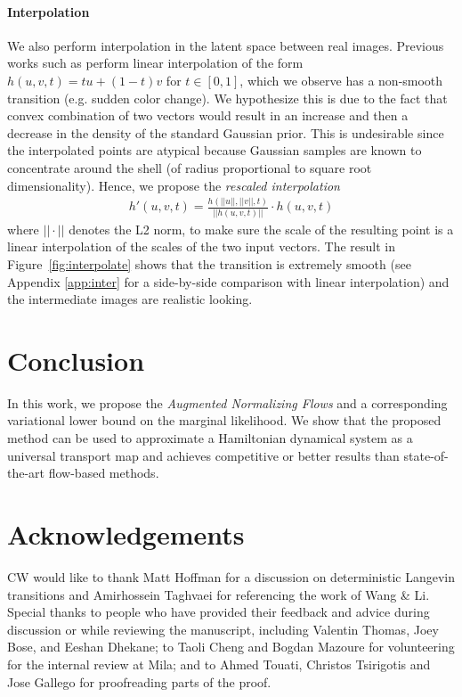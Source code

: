 \documentclass{article}
\begin{document}
\paragraph{Interpolation}
We also perform interpolation in the latent space between real images. 
Previous works such as \citet{kingma2018glow} perform linear interpolation of the form $h(u, v, t)=tu+(1-t)v$ for $t\in[0,1]$, which we observe has a non-smooth transition (e.g. sudden color change). 
We hypothesize this is due to the fact that convex combination of two vectors would result in an increase and then a decrease in the density of the standard Gaussian prior. 
This is undesirable since the interpolated points are atypical because Gaussian samples are known to concentrate around the shell (of radius proportional to square root dimensionality). 
Hence, we propose the \emph{rescaled interpolation}
\begin{align}
h'(u,v,t) = \frac{h(||u||,||v||,t)}{||h(u,v,t)||}\cdot h(u,v,t)
\end{align}
where $||\cdot||$ denotes the L2 norm, to make sure the scale of the resulting point is a linear interpolation of the scales of the two input vectors.
The result in Figure~\ref{fig:interpolate} shows that the transition is extremely smooth (see Appendix \ref{app:inter} for a side-by-side comparison with linear interpolation) and the intermediate images are realistic looking. 




\section{Conclusion}
In this work, we propose the \emph{Augmented Normalizing Flows} and a corresponding variational lower bound on the marginal likelihood.
We show that the proposed method can be used to approximate a Hamiltonian dynamical system as a universal transport map and achieves competitive or better results than state-of-the-art flow-based methods. 


\iftrue
\section*{Acknowledgements}{
CW would like to thank 
Matt Hoffman for a discussion on deterministic Langevin transitions and Amirhossein Taghvaei for referencing the work of Wang \& Li. 
Special thanks to people who have provided their feedback and advice during discussion or while reviewing the manuscript, including Valentin Thomas, Joey Bose, and Eeshan Dhekane; to
Taoli Cheng and Bogdan Mazoure for volunteering for the internal review at Mila; and to Ahmed Touati, Christos Tsirigotis and Jose Gallego for proofreading parts of the proof. 
}
\fi
\end{document}
